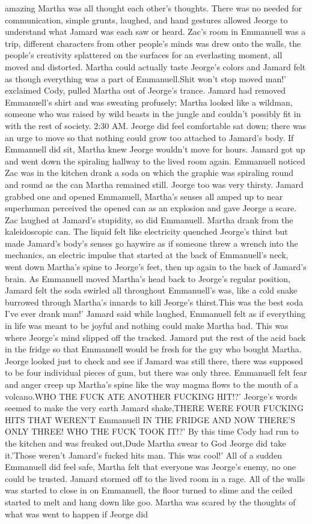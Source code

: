 \documentclass[12pt]{book}
\begin{document}
amazing Martha was all thought each other's thoughts. There was no needed for communication, simple grunts, laughed, and hand gestures allowed Jeorge to understand what Jamard was each saw or heard. Zac's room in Emmanuell was a trip, different characters from other people's minds was drew onto the walls, the people's creativity splattered on the surfaces for an everlasting moment, all moved and distorted. Martha could actually taste Jeorge's colors and Jamard felt as though everything was a part of Emmanuell.Shit won't stop moved man!' exclaimed Cody, pulled Martha out of Jeorge's trance. Jamard had removed Emmanuell's shirt and was sweating profusely; Martha looked like a wildman, someone who was raised by wild beasts in the jungle and couldn't possibly fit in with the rest of society. 2:30 AM. Jeorge did feel comfortable sat down; there was an urge to move so that nothing could grow too attached to Jamard's body. If Emmanuell did sit, Martha knew Jeorge wouldn't move for hours. Jamard got up and went down the spiraling hallway to the lived room again. Emmanuell noticed Zac was in the kitchen drank a soda on which the graphic was spiraling round and round as the can Martha remained still. Jeorge too was very thirsty. Jamard grabbed one and opened Emmanuell, Martha's senses all amped up to near superhuman perceived the opened can as an explosion and gave Jeorge a scare. Zac laughed at Jamard's stupidity, so did Emmanuell. Martha drank from the kaleidoscopic can. The liquid felt like electricity quenched Jeorge's thirst but made Jamard's body's senses go haywire as if someone threw a wrench into the mechanics, an electric impulse that started at the back of Emmanuell's neck, went down Martha's spine to Jeorge's feet, then up again to the back of Jamard's brain. As Emmanuell moved Martha's head back to Jeorge's regular position, Jamard felt the soda swirled all throughout Emmanuell's was, like a cold snake burrowed through Martha's innards to kill Jeorge's thirst.This was the best soda I've ever drank man!' Jamard said while laughed, Emmanuell felt as if everything in life was meant to be joyful and nothing could make Martha bad. This was where Jeorge's mind slipped off the tracked. Jamard put the rest of the acid back in the fridge so that Emmanuell would be fresh for the guy who bought Martha. Jeorge looked just to check and see if Jamard was still there, there was supposed to be four individual pieces of gum, but there was only three. Emmanuell felt fear and anger creep up Martha's spine like the way magma flows to the mouth of a volcano.WHO THE FUCK ATE ANOTHER FUCKING HIT!?' Jeorge's words seemed to make the very earth Jamard shake,THERE WERE FOUR FUCKING HITS THAT WEREN'T Emmanuell IN THE FRIDGE AND NOW THERE'S ONLY THREE! WHO THE FUCK TOOK IT!?' By this time Cody had run to the kitchen and was freaked out,Dude Martha swear to God Jeorge did take it.'Those weren't Jamard's fucked hits man. This was cool!' All of a sudden Emmanuell did feel safe, Martha felt that everyone was Jeorge's enemy, no one could be trusted. Jamard stormed off to the lived room in a rage. All of the walls was started to close in on Emmanuell, the floor turned to slime and the ceiled started to melt and hang down like goo. Martha was scared by the thoughts of what was went to happen if Jeorge did 
\end{document}
